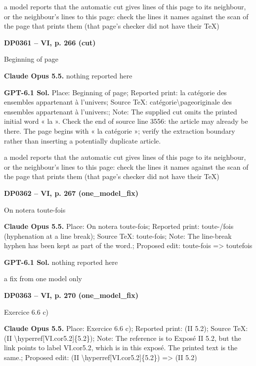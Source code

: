 a model reports that the automatic cut gives lines of this page to its neighbour, or the neighbour's lines to this page: check the lines it names against the scan of the page that prints them (that page's checker did not have their TeX)\par
\par\noindent\hypertarget{DP0361}{}\textbf{DP0361 -- VI, p. 266 (cut)}\par
Beginning of page\par
\textbf{Claude Opus 5.5.} nothing reported here\par
\textbf{GPT-6.1 Sol.} Place: Beginning of page; Reported print: la catégorie des ensembles appartenant à l'univers; Source TeX: catégorie\textbackslash{}pageoriginale des ensembles appartenant à l'univers:; Note: The supplied cut omits the printed initial word « la ». Check the end of source line 3556: the article may already be there. The page begins with « la catégorie »; verify the extraction boundary rather than inserting a potentially duplicate article.\par
a model reports that the automatic cut gives lines of this page to its neighbour, or the neighbour's lines to this page: check the lines it names against the scan of the page that prints them (that page's checker did not have their TeX)\par
\par\noindent\hypertarget{DP0362}{}\textbf{DP0362 -- VI, p. 267 (one\_model\_fix)}\par
On notera toute-fois\par
\textbf{Claude Opus 5.5.} Place: On notera toute-fois; Reported print: toute-/fois (hyphenation at a line break); Source TeX: toute-fois; Note: The line-break hyphen has been kept as part of the word.; Proposed edit: toute-fois =\allowbreak > toutefois\par
\textbf{GPT-6.1 Sol.} nothing reported here\par
a fix from one model only\par
\par\noindent\hypertarget{DP0363}{}\textbf{DP0363 -- VI, p. 270 (one\_model\_fix)}\par
Exercice 6.6 c)\par
\textbf{Claude Opus 5.5.} Place: Exercice 6.6 c); Reported print: (II 5.2); Source TeX: (II \textbackslash{}hyperref[VI.cor5.2]\{5.2\}); Note: The reference is to Exposé II 5.2, but the link points to label VI.cor5.2, which is in this exposé. The printed text is the same.; Proposed edit: (II \textbackslash{}hyperref[VI.cor5.2]\{5.2\}) =\allowbreak > (II 5.2)\par
